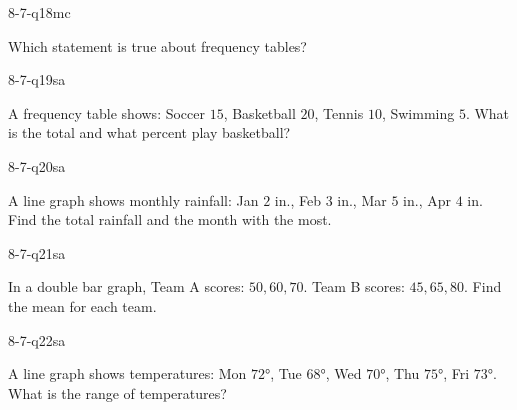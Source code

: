 \begin{practiceQuestion}{8-7-q18}{mc}
\begin{questionText}
Which statement is true about frequency tables?
\end{questionText}
\end{practiceQuestion}


\begin{practiceQuestion}{8-7-q19}{sa}
\begin{questionText}
A frequency table shows: Soccer $15$, Basketball $20$, Tennis $10$, Swimming $5$. What is the total and what percent play basketball?
\end{questionText}
\end{practiceQuestion}

\begin{practiceQuestion}{8-7-q20}{sa}
\begin{questionText}
A line graph shows monthly rainfall: Jan $2$ in., Feb $3$ in., Mar $5$ in., Apr $4$ in. Find the total rainfall and the month with the most.
\end{questionText}
\end{practiceQuestion}

\begin{practiceQuestion}{8-7-q21}{sa}
\begin{questionText}
In a double bar graph, Team A scores: $50, 60, 70$. Team B scores: $45, 65, 80$. Find the mean for each team.
\end{questionText}
\end{practiceQuestion}

\begin{practiceQuestion}{8-7-q22}{sa}
\begin{questionText}
A line graph shows temperatures: Mon $72°$, Tue $68°$, Wed $70°$, Thu $75°$, Fri $73°$. What is the range of temperatures?
\end{questionText}
\end{practiceQuestion}

